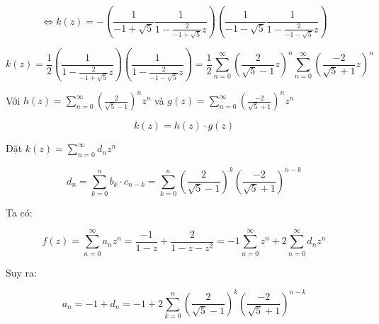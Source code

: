 \documentclass[12pt,a4paper]{article}
\begin{document}
\begin{enumerate}[label=\textbf{Câu 2:} ]
\begin{itemize}
\[
\Leftrightarrow k(z) = -\left( \frac{1}{-1 + \sqrt{5}} \frac{1}{1 - \frac{2}{-1 + \sqrt{5}}z} \right) \left( \frac{1}{-1 - \sqrt{5}} \frac{1}{1 - \frac{2}{-1 - \sqrt{5}}z} \right)
\]

\[
k(z) = \frac{1}{2} \left( \frac{1}{1 - \frac{2}{-1 + \sqrt{5}}z} \right) \left( \frac{1}{1 - \frac{2}{-1 - \sqrt{5}}z} \right) = \frac{1}{2} \sum_{n=0}^{\infty} \left( \frac{2}{\sqrt{5} - 1}z \right)^n \sum_{n=0}^{\infty} \left( \frac{-2}{\sqrt{5} + 1}z \right)^n
\]

Với \( h(z) = \sum_{n=0}^{\infty} \left( \frac{2}{\sqrt{5} - 1} \right)^n z^n \) và \( g(z) = \sum_{n=0}^{\infty} \left( \frac{-2}{\sqrt{5} + 1} \right)^n z^n \)

\[
k(z) = h(z) \cdot g(z)
\]

Đặt \( k(z) = \sum_{n=0}^{\infty} d_n z^n \)

\[
d_n = \sum_{k=0}^{n} b_k \cdot c_{n-k} = \sum_{k=0}^{n} \left( \frac{2}{\sqrt{5} - 1} \right)^k \left( \frac{-2}{\sqrt{5} + 1} \right)^{n-k}
\]

Ta có:

\[
f(z) = \sum_{n=0}^{\infty} a_n z^n = \frac{-1}{1-z} + \frac{2}{1-z-z^2} = -1 \sum_{n=0}^{\infty} z^n + 2 \sum_{n=0}^{\infty} d_n z^n
\]

Suy ra:

\[
a_n = -1 + d_n = -1 + 2 \sum_{k=0}^{n} \left( \frac{2}{\sqrt{5} - 1} \right)^k \left( \frac{-2}{\sqrt{5} + 1} \right)^{n-k}
\]
\end{itemize}
\end{enumerate}
\end{document}
